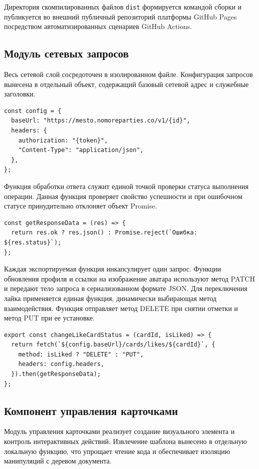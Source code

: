 \documentclass[bachelor, och, pract, times]{SCWorks}
\begin{document}
Директория скомпилированных файлов \texttt{dist} формируется командой сборки и публикуется во внешний публичный репозиторий платформы GitHub Pages посредством автоматизированных сценариев GitHub Actions.

\subsection{Модуль сетевых запросов}
Весь сетевой слой сосредоточен в изолированном файле. Конфигурация запросов
вынесена в отдельный объект, содержащий базовый сетевой адрес и служебные
заголовки.

\begin{verbatim}
const config = {
  baseUrl: "https://mesto.nomoreparties.co/v1/{id}",
  headers: {
    authorization: "{token}",
    "Content-Type": "application/json",
  },
};
\end{verbatim}

Функция обработки ответа служит единой точкой проверки статуса выполнения
операции. Данная функция проверяет свойство успешности и при ошибочном статусе
принудительно отклоняет объект Promise.

\begin{verbatim}
const getResponseData = (res) => {
  return res.ok ? res.json() : Promise.reject(`Ошибка: ${res.status}`);
};
\end{verbatim}

Каждая экспортируемая функция инкапсулирует один запрос. Функции обновления
профиля и ссылки на изображение аватара используют метод PATCH и передают тело
запроса в сериализованном формате JSON. Для переключения лайка применяется
единая функция, динамически выбирающая метод взаимодействия. Функция отправляет
метод DELETE при снятии отметки и метод PUT при ее установке.

\begin{verbatim}
export const changeLikeCardStatus = (cardId, isLiked) => {
  return fetch(`${config.baseUrl}/cards/likes/${cardId}`, {
    method: isLiked ? "DELETE" : "PUT",
    headers: config.headers,
  }).then(getResponseData);
};
\end{verbatim}

\subsection{Компонент управления карточками}
Модуль управления карточками реализует создание визуального элемента и контроль
интерактивных действий. Извлечение шаблона вынесено в отдельную локальную
функцию, что упрощает чтение кода и обеспечивает изоляцию манипуляций с деревом
документа.
\end{document}
